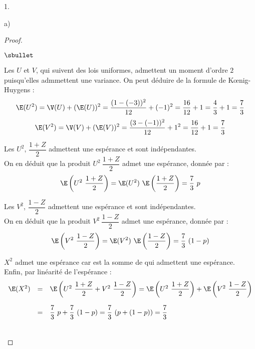 \documentclass[11pt]{article}%
\begin{document}
\begin{noliste}{1.}
\begin{noliste}{a)}
\begin{proof}
\begin{noliste}{$\sbullet$}
      \item Les \var $U$ et $V$, qui suivent des lois uniformes,
        admettent un moment d'ordre $2$ puisqu'elles admmettent une
        variance. On peut déduire de la formule de K\oe{}nig-Huygens :
        \[
        \E(U^2) = \V(U) + (\E(U))^2 = \dfrac{(1-(-3))^2}{12} + (-1)^2
        = \dfrac{16}{12} + 1 = \dfrac{4}{3} + 1 = \dfrac{7}{3}
        \]
        \[
        \E(V^2) = \V(V) + (\E(V))^2 = \dfrac{(3-(-1))^2}{12} + 1^2 =
        \dfrac{16}{12} + 1 = \dfrac{7}{3}
        \]

      \item Les \var $U^2$, $\dfrac{1 + Z}{2}$ admettent une espérance
        et sont indépendantes.\\
        On en déduit que la \var produit $U^2 \ \dfrac{1 + Z}{2}$
        admet une espérance, donnée par :
        \[
        \E\left( U^2 \ \dfrac{1 + Z}{2} \right) = \E(U^2) \
        \E\left(\dfrac{1 + Z}{2}\right) = \dfrac{7}{3} \ p
        \]

      \item Les \var $V^2$, $\dfrac{1 - Z}{2}$ admettent une espérance
        et sont indépendantes. \\
        On en déduit que la \var produit $V^2 \ \dfrac{1 - Z}{2}$
        admet une espérance, donnée par :
        \[
        \E\left( V^2 \ \dfrac{1 - Z}{2} \right) = \E(V^2) \
        \E\left(\dfrac{1 - Z}{2} \right) = \dfrac{7}{3} \ (1-p)
        \]

      \item $X^2$ admet une espérance car est la somme de \var qui
        admettent une espérance.\\
        Enfin, par linéarité de l'espérance :
        \[
        \begin{array}{rcl}
          \E(X^2) & = & \E\left(U^2 \ \dfrac{1 + Z}{2} + V^2 \ \dfrac{1 -
              Z}{2}\right) = \E\left(U^2 \ \dfrac{1 + Z}{2}\right) +
          \E\left(V^2 \ \dfrac{1 - Z}{2}\right) \\[.6cm]
          & = & \dfrac{7}{3} \ p + \dfrac{7}{3} \ (1-p) = \dfrac{7}{3}
          \ (p+(1-p)) = \dfrac{7}{3}
        \end{array}
        \]        
      \end{noliste}
      ~\\[-1.2cm]
    \end{proof}

\end{noliste}


\end{noliste}
\end{document}
